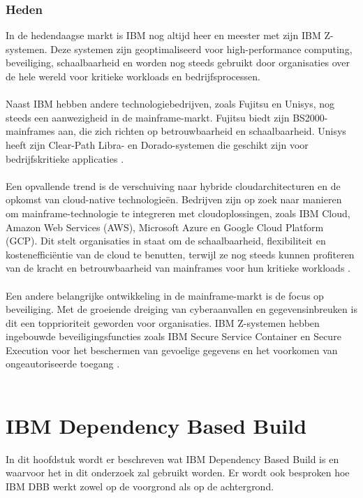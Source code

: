 \subsubsection{Heden}
In de hedendaagse markt is IBM nog altijd heer en meester met zijn IBM Z-systemen. Deze systemen zijn geoptimaliseerd voor high-performance computing, beveiliging, schaalbaarheid en worden nog steeds gebruikt door organisaties over de hele wereld voor kritieke workloads en bedrijfsprocessen.
\\ \\
Naast IBM hebben andere technologiebedrijven, zoals Fujitsu en Unisys, nog steeds een aanwezigheid in de mainframe-markt. Fujitsu biedt zijn BS2000-mainframes aan, die zich richten op betrouwbaarheid en schaalbaarheid. Unisys heeft zijn Clear-Path Libra- en Dorado-systemen die geschikt zijn voor bedrijfskritieke applicaties \autocite{Fujitsu} \autocite{Unisys}.
\\ \\
Een opvallende trend is de verschuiving naar hybride cloudarchitecturen en de opkomst van cloud-native technologieën. Bedrijven zijn op zoek naar manieren om mainframe-technologie te integreren met cloudoplossingen, zoals IBM Cloud, Amazon Web Services (AWS), Microsoft Azure en Google Cloud Platform (GCP). Dit stelt organisaties in staat om de schaalbaarheid, flexibiliteit en kostenefficiëntie van de cloud te benutten, terwijl ze nog steeds kunnen profiteren van de kracht en betrouwbaarheid van mainframes voor hun kritieke workloads \autocite{Google} \autocite{AWS}.
\\ \\
Een andere belangrijke ontwikkeling in de mainframe-markt is de focus op beveiliging. Met de groeiende dreiging van cyberaanvallen en gegevensinbreuken is dit een topprioriteit geworden voor organisaties. IBM Z-systemen hebben ingebouwde beveiligingsfuncties zoals IBM Secure Service Container en Secure Execution voor het beschermen van gevoelige gegevens en het voorkomen van ongeautoriseerde toegang \autocite{IBMa}.
\\ \\
\section{IBM Dependency Based Build}
\label{sec:IBM dependency based build}
In dit hoofdstuk wordt er beschreven wat IBM Dependency Based Build is en waarvoor het in dit onderzoek zal gebruikt worden. Er wordt ook besproken hoe IBM DBB werkt zowel op de voorgrond als op de achtergrond.
\\ \\

